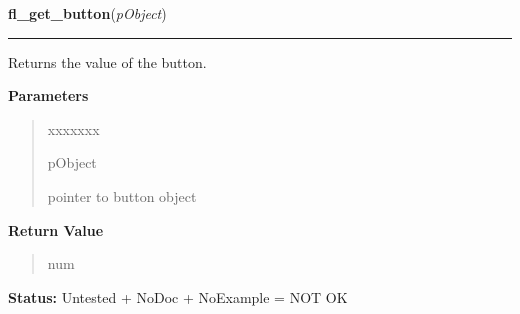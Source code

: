     \label{xformslib:library:fl_get_button}

    \vspace{0.5ex}

\hspace{.8\funcindent}\begin{boxedminipage}{\funcwidth}

    \raggedright \textbf{fl\_get\_button}(\textit{pObject})

    \vspace{-1.5ex}

    \rule{\textwidth}{0.5\fboxrule}
\setlength{\parskip}{2ex}
    Returns the value of the button.

\setlength{\parskip}{1ex}
      \textbf{Parameters}
      \vspace{-1ex}

      \begin{quote}
        \begin{Ventry}{xxxxxxx}

          \item[pObject]

          pointer to button object

        \end{Ventry}

      \end{quote}

      \textbf{Return Value}
    \vspace{-1ex}

      \begin{quote}
      num

      \end{quote}

\textbf{Status:} Untested + NoDoc + NoExample = NOT OK



    \end{boxedminipage}

    \label{xformslib:library:fl_set_button}

    \vspace{0.5ex}

